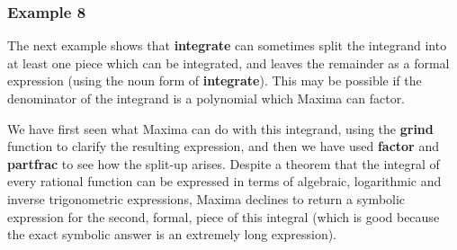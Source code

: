 \documentclass[12pt]{article}
\begin{document}
\subsubsection*{Example 8}
The next example shows that \textbf{integrate} can sometimes split the
  integrand into at least one piece which can be integrated, and leaves the
  remainder as a formal expression (using the noun form of \textbf{integrate}).
This may be possible if the denominator of the integrand is a polynomial
  which Maxima can factor.
We have first seen what Maxima can do with this integrand, using the \textbf{grind}
  function to clarify the resulting expression, and then we have used \textbf{factor}
  and \textbf{partfrac} to see how the split-up arises.
Despite a theorem that the integral of every rational function can be expressed in terms
  of algebraic, logarithmic and inverse trigonometric expressions, Maxima
  declines to return a symbolic expression for the second, formal, piece of this
  integral (which is good because the exact symbolic answer is an extremely long
  expression).
\end{document}
